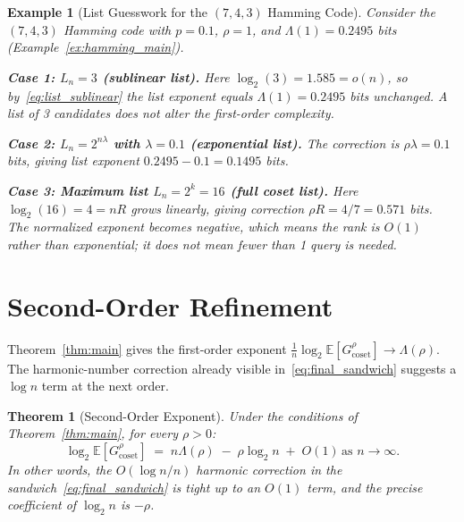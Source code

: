 \documentclass[journal,10pt,onecolumn]{IEEEtran}
\newtheorem{theorem}{Theorem}
\newtheorem{example}{Example}
\newcommand{\Eb}{\mathbb{E}}
\begin{document}
\begin{example}[List Guesswork for the $(7,4,3)$ Hamming Code]
\label{ex:hamming_list}
Consider the $(7,4,3)$ Hamming code with $p=0.1$, $\rho=1$,
and $\Lambda(1) = 0.2495$ bits (Example~\ref{ex:hamming_main}).

\noindent\textbf{Case 1: $L_n=3$ (sublinear list).}
Here $\log_2(3) = 1.585=o(n)$, so by~\eqref{eq:list_sublinear}
the list exponent equals $\Lambda(1) = 0.2495$ bits unchanged.
A list of 3 candidates does not alter the first-order complexity.

\noindent\textbf{Case 2: $L_n=2^{n\lambda}$ with $\lambda=0.1$ (exponential list).}
The correction is $\rho\lambda=0.1$ bits, giving list exponent
$0.2495-0.1=0.1495$ bits.

\noindent\textbf{Case 3: Maximum list $L_n=2^k=16$ (full coset list).}
Here $\log_2(16)=4=nR$ grows linearly, giving correction
$\rho R=4/7 = 0.571$ bits. The normalized exponent becomes negative,
which means the rank is $O(1)$ rather than exponential; it does \emph{not}
mean fewer than 1 query is needed.
\end{example}



\section{Second-Order Refinement}
\label{sec:second_order}

Theorem~\ref{thm:main} gives the first-order exponent
$\frac{1}{n}\log_2\Eb[G_{\mathrm{coset}}^\rho]\to\Lambda(\rho)$.
The harmonic-number correction already visible in~\eqref{eq:final_sandwich}
suggests a $\log n$ term at the next order.

\begin{theorem}[Second-Order Exponent]
\label{thm:second_order}
Under the conditions of Theorem~\ref{thm:main}, for every $\rho>0$:
\begin{equation}
    \log_2\Eb\!\left[G_{\mathrm{coset}}^{\rho}\right]
    \;=\;
    n\Lambda(\rho)
    \;-\;\rho\log_2 n
    \;+\;O(1)
    \,
    \text{as }n\to\infty.
\label{eq:second_order}
\end{equation}
In other words, the $O(\log n/n)$ harmonic correction in the
sandwich~\eqref{eq:final_sandwich} is tight up to an $O(1)$ term,
and the precise coefficient of $\log_2 n$ is $-\rho$.
\end{theorem}
\end{document}
